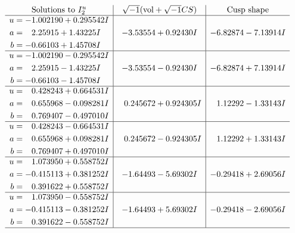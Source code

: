 \documentclass[1p]{elsarticle_modified}
\theoremstyle{definition}
\newcommand{\I}{\sqrt{-1}}
\begin{document}
$$\begin{array}{c|c|c}  
\text{Solutions to }I^u_{2}& \I (\text{vol} + \sqrt{-1}CS) & \text{Cusp shape}\\
 \hline 
\begin{aligned}
u &= -1.002190 + 0.295542 I \\
a &= \phantom{-}2.25915 + 1.43225 I \\
b &= -0.66103 + 1.45708 I\end{aligned}
 & -3.53554 + 0.92430 I & -6.82874 - 7.13914 I \\ \hline\begin{aligned}
u &= -1.002190 - 0.295542 I \\
a &= \phantom{-}2.25915 - 1.43225 I \\
b &= -0.66103 - 1.45708 I\end{aligned}
 & -3.53554 - 0.92430 I & -6.82874 + 7.13914 I \\ \hline\begin{aligned}
u &= \phantom{-}0.428243 + 0.664531 I \\
a &= \phantom{-}0.655968 - 0.098281 I \\
b &= \phantom{-}0.769407 - 0.497010 I\end{aligned}
 & \phantom{-}0.245672 + 0.924305 I & \phantom{-}1.12292 - 1.33143 I \\ \hline\begin{aligned}
u &= \phantom{-}0.428243 - 0.664531 I \\
a &= \phantom{-}0.655968 + 0.098281 I \\
b &= \phantom{-}0.769407 + 0.497010 I\end{aligned}
 & \phantom{-}0.245672 - 0.924305 I & \phantom{-}1.12292 + 1.33143 I \\ \hline\begin{aligned}
u &= \phantom{-}1.073950 + 0.558752 I \\
a &= -0.415113 + 0.381252 I \\
b &= \phantom{-}0.391622 + 0.558752 I\end{aligned}
 & -1.64493 - 5.69302 I & -0.29418 + 2.69056 I \\ \hline\begin{aligned}
u &= \phantom{-}1.073950 - 0.558752 I \\
a &= -0.415113 - 0.381252 I \\
b &= \phantom{-}0.391622 - 0.558752 I\end{aligned}
 & -1.64493 + 5.69302 I & -0.29418 - 2.69056 I\\
 \hline 
 \end{array}$$\newpage
\end{document}

